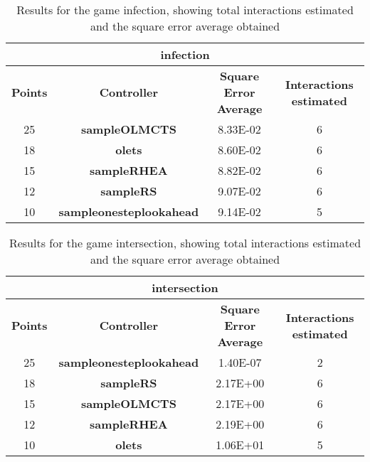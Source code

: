 \begin{table*}[!t]
\begin{center}
\begin{adjustbox}{width=1\textwidth}
\begin{tabular}{|c|c|c|c|}
\hline
\multicolumn{4}{|c|}{\textbf{infection}}\\
\hline
\textbf{Points} & \textbf{Controller} & \textbf{Square Error Average} & \textbf{Interactions estimated}\\
\hline
25 & \textbf{sampleOLMCTS} & 8.33E-02 & 6
 \\
\hline
18 & \textbf{olets} & 8.60E-02 & 6
 \\
\hline
15 & \textbf{sampleRHEA} & 8.82E-02 & 6
 \\
\hline
12 & \textbf{sampleRS} & 9.07E-02 & 6
 \\
\hline
10 & \textbf{sampleonesteplookahead} & 9.14E-02 & 5
 \\
\hline
\end{tabular}
\end{adjustbox}
\caption{Results for the game infection, showing total interactions estimated and the square error average obtained}
\label{tab:weights}
\end{center}
\end{table*}
\begin{table*}[!t]
\begin{center}
\begin{adjustbox}{width=1\textwidth}
\begin{tabular}{|c|c|c|c|}
\hline
\multicolumn{4}{|c|}{\textbf{intersection}}\\
\hline
\textbf{Points} & \textbf{Controller} & \textbf{Square Error Average} & \textbf{Interactions estimated}\\
\hline
25 & \textbf{sampleonesteplookahead} & 1.40E-07 & 2
 \\
\hline
18 & \textbf{sampleRS} & 2.17E+00 & 6
 \\
\hline
15 & \textbf{sampleOLMCTS} & 2.17E+00 & 6
 \\
\hline
12 & \textbf{sampleRHEA} & 2.19E+00 & 6
 \\
\hline
10 & \textbf{olets} & 1.06E+01 & 5
 \\
\hline
\end{tabular}
\end{adjustbox}
\caption{Results for the game intersection, showing total interactions estimated and the square error average obtained}
\label{tab:weights}
\end{center}
\end{table*}
